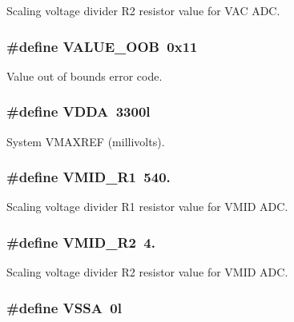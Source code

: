 Scaling voltage divider R2 resistor value for V\-A\-C A\-D\-C. \hypertarget{a00043_a055087c0064c322a05e443b47479bfe1}{
\subsubsection[{V\-A\-L\-U\-E\-\_\-\-O\-O\-B}]{\setlength{\rightskip}{0pt plus 5cm}\#define V\-A\-L\-U\-E\-\_\-\-O\-O\-B~0x11}}\label{a00043_a055087c0064c322a05e443b47479bfe1}
Value out of bounds error code. \hypertarget{a00043_a2d52976aedaedf74a90019a689170620}{
\subsubsection[{V\-D\-D\-A}]{\setlength{\rightskip}{0pt plus 5cm}\#define V\-D\-D\-A~3300l}}\label{a00043_a2d52976aedaedf74a90019a689170620}
System V\-M\-A\-X\-R\-E\-F (millivolts). \hypertarget{a00043_a511faa1530ba984d340a884a97e6a80a}{
\subsubsection[{V\-M\-I\-D\-\_\-\-R1}]{\setlength{\rightskip}{0pt plus 5cm}\#define V\-M\-I\-D\-\_\-\-R1~540.}}\label{a00043_a511faa1530ba984d340a884a97e6a80a}
Scaling voltage divider R1 resistor value for V\-M\-I\-D A\-D\-C. \hypertarget{a00043_a86d7f47e3c125143c21e1ca2836eb4ab}{
\subsubsection[{V\-M\-I\-D\-\_\-\-R2}]{\setlength{\rightskip}{0pt plus 5cm}\#define V\-M\-I\-D\-\_\-\-R2~4.}}\label{a00043_a86d7f47e3c125143c21e1ca2836eb4ab}
Scaling voltage divider R2 resistor value for V\-M\-I\-D A\-D\-C. \hypertarget{a00043_a3c2e957a61cfa19e31e8477fe3aacab8}{
\subsubsection[{V\-S\-S\-A}]{\setlength{\rightskip}{0pt plus 5cm}\#define V\-S\-S\-A~0l}}\label{a00043_a3c2e957a61cfa19e31e8477fe3aacab8}
